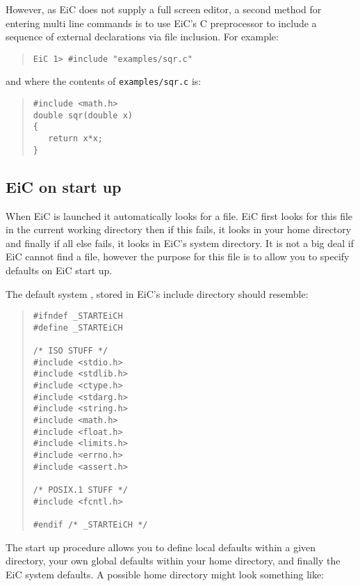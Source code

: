 However, as EiC does not supply a full screen editor,
a second method for entering multi line commands is to use EiC's C
preprocessor to include a sequence of external declarations via file
inclusion. For example:

\begin{quote}
\begin{verbatim}
EiC 1> #include "examples/sqr.c"
\end{verbatim}
\end{quote}

and where the contents of {\tt examples/sqr.c} is:

\begin{quote}
\begin{verbatim}
#include <math.h>
double sqr(double x) 
{
   return x*x;
} 
\end{verbatim}  
\end{quote}


\subsection{EiC on start up}
\label{sec:starteich}

When EiC is launched it automatically looks for a
 file. EiC first looks for this file in the current
working directory then if this fails, it looks in your home directory
and finally if all else fails, it looks in EiC's system
 directory. It is not a big deal if EiC cannot find a
 file, however the purpose for this file is to allow you to 
specify defaults on EiC start up.

The default system , stored in
EiC's include directory should resemble:

\begin{quote}
\begin{verbatim}
#ifndef _STARTEiCH
#define _STARTEiCH

/* ISO STUFF */
#include <stdio.h>
#include <stdlib.h>
#include <ctype.h>
#include <stdarg.h>
#include <string.h>
#include <math.h>
#include <float.h>
#include <limits.h>
#include <errno.h>
#include <assert.h>

/* POSIX.1 STUFF */
#include <fcntl.h>

#endif /* _STARTEiCH */
\end{verbatim}
\end{quote}

The start up procedure allows you to define local defaults within a
given directory, your own global defaults within your home directory,
and finally the EiC system defaults. A possible home directory
 might look something like:

